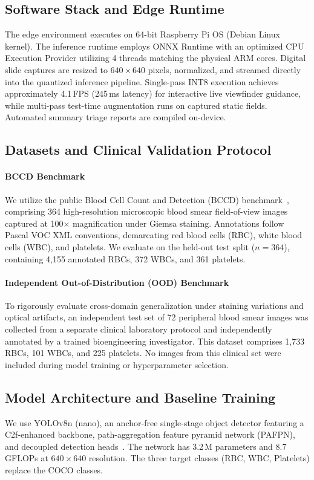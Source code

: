 \documentclass[10pt,conference]{IEEEtran}
\begin{document}
\subsection{Software Stack and Edge Runtime}
The edge environment executes on 64-bit Raspberry Pi OS (Debian Linux kernel). The inference runtime employs ONNX Runtime with an optimized CPU Execution Provider utilizing 4 threads matching the physical ARM cores. Digital slide captures are resized to $640 \times 640$ pixels, normalized, and streamed directly into the quantized inference pipeline. Single-pass INT8 execution achieves approximately 4.1\,FPS (245\,ms latency) for interactive live viewfinder guidance, while multi-pass test-time augmentation runs on captured static fields. Automated summary triage reports are compiled on-device.

\subsection{Datasets and Clinical Validation Protocol}
\paragraph{BCCD Benchmark} We utilize the public Blood Cell Count and Detection (BCCD) benchmark~\cite{bccd}, comprising 364 high-resolution microscopic blood smear field-of-view images captured at 100$\times$ magnification under Giemsa staining. Annotations follow Pascal VOC XML conventions, demarcating red blood cells (RBC), white blood cells (WBC), and platelets. We evaluate on the held-out test split ($n = 364$), containing 4,155 annotated RBCs, 372 WBCs, and 361 platelets.
\paragraph{Independent Out-of-Distribution (OOD) Benchmark} To rigorously evaluate cross-domain generalization under staining variations and optical artifacts, an independent test set of 72 peripheral blood smear images was collected from a separate clinical laboratory protocol and independently annotated by a trained bioengineering investigator. This dataset comprises 1,733 RBCs, 101 WBCs, and 225 platelets. No images from this clinical set were included during model training or hyperparameter selection.

\subsection{Model Architecture and Baseline Training}
\label{sec:baseline_model}
We use YOLOv8n (nano), an anchor-free single-stage object detector featuring a C2f-enhanced backbone, path-aggregation feature pyramid network (PAFPN), and decoupled detection heads~\cite{yolov8}. The network has 3.2\,M parameters and 8.7\,GFLOPs at $640 \times 640$ resolution. The three target classes (RBC, WBC, Platelets) replace the COCO classes.
\end{document}
